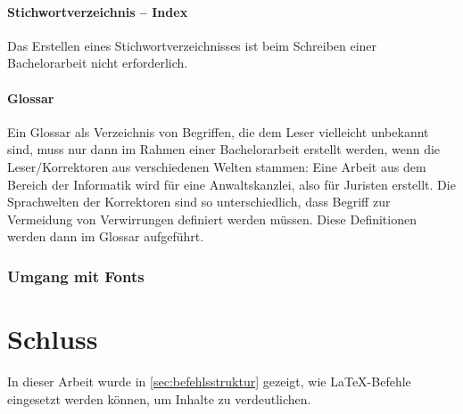 \subsubsection{Stichwortverzeichnis -- Index}

Das Erstellen eines Stichwortverzeichnisses ist beim Schreiben einer
Bachelorarbeit nicht erforderlich.


\subsubsection{Glossar}

Ein Glossar als Verzeichnis von Begriffen, die dem Leser vielleicht
unbekannt sind, muss nur dann im Rahmen einer Bachelorarbeit erstellt
werden, wenn die Leser/Korrektoren aus verschiedenen Welten stammen:
Eine Arbeit aus dem Bereich der Informatik wird für eine Anwaltskanzlei,
also für Juristen erstellt. Die Sprachwelten der Korrektoren sind so
unterschiedlich, dass Begriff zur Vermeidung von Verwirrungen definiert
werden müssen. Diese Definitionen werden dann im Glossar aufgeführt.


\subsection{Umgang mit Fonts}

\chapter{Schluss}

In dieser Arbeit wurde in \cref{sec:befehlsstruktur} gezeigt, wie
\LaTeX-Befehle eingesetzt werden können, um Inhalte zu verdeutlichen.

\backmatter                     %

\printbibliography




